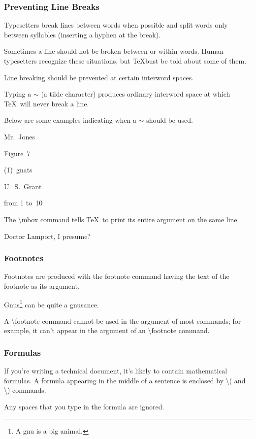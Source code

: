 \documentclass[twocolumn]{article}        %
\begin{document}
\subsubsection*{Preventing Line Breaks}

Typesetters break lines between words when possible and split words only between syllables 
(inserting a hyphen at the break).

Sometimes a line should not be broken between or within words. Human typesetters recognize 
these situations, but \TeX bust be told about some of them.

Line breaking should be prevented at certain interword spaces.

Typing a $\sim$ (a tilde character) produces ordinary interword space at which \TeX\ will never break a line.

Below are some examples indicating when a $\sim$ should be used.

Mr.~Jones

Figure~7

(1)~gnats

U.~S.~Grant

from 1 to~10

The \textbackslash  mbox command tells \TeX\ to print its entire argument on the same line.

Doctor \mbox{Lamport}, I presume?

\subsubsection*{Footnotes}

Footnotes are produced with the footnote command having the text of the footnote as its argument.

Gnus\footnote{A gnu is a big animal.} can be quite a gnusance.

A \textbackslash footnote command cannot be used in the argument of most commands;
for example, it can't appear in the argument of an \textbackslash footnote command.

\subsubsection*{Formulas}

If you're writing a technical document, it's likely to contain mathematical formulas.
A formula appearing in the middle of a sentence is enclosed by \textbackslash ( 
and \textbackslash ) commands.

Any spaces that you type in the formula are ignored.
\end{document}
